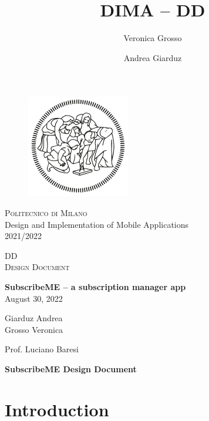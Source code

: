 \documentclass[12pt]{article}
\title{DIMA -- DD}
\author{Veronica Grosso \and Andrea Giarduz}
\begin{document}
\begin{titlepage}
    \begin{center}
        \vspace*{1cm}
        \begin{figure}[h]
            \begin{center}
                \includegraphics[width=4.5cm, clip]{../../assets/logo.png}
            \end{center}
            \label{title:logo}
        \end{figure}
        \vspace*{1cm}
        \LARGE{{\scshape Politecnico di Milano}}
        \\
        \LARGE{Design and Implementation of Mobile Applications}
        \\
        \LARGE{2021/2022}

        \vspace*{1.5cm}
        \Huge{DD}
        \\
        \Large{{\scshape Design Document}}

        \vspace{1.5cm}

        \LARGE{\textbf{SubscribeME -- a subscription manager app}}
        \\
        \vspace{1cm}
        \Large{August 30, 2022}
        \vfill

        \Large{Giarduz Andrea\\
            Grosso Veronica
        }

        \vspace{0.8cm}

        \Large
        Prof. Luciano Baresi
    \end{center}
\end{titlepage}
\tableofcontents

\newpage
\begin{center}
    \LARGE{\textbf{SubscribeME Design Document}}
\end{center}
\section{Introduction}\label{sec:intro}
\end{document}
